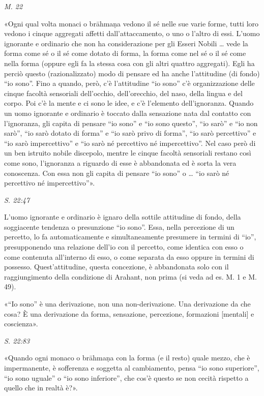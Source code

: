 \emph{M. 22}


«Ogni qual volta monaci o brāhmaṇa vedono il sé nelle sue varie forme,
tutti loro vedono i cinque aggregati affetti dall’attaccamento, o uno o
l’altro di essi. L’uomo ignorante e ordinario che non ha considerazione
per gli Esseri Nobili … vede la forma come sé o il sé come dotato di
forma, la forma come nel sé o il sé come nella forma (oppure egli fa la
stessa cosa con gli altri quattro aggregati). Egli ha perciò questo
(razionalizzato) modo di pensare ed ha anche l’attitudine (di fondo) “io
sono”. Fino a quando, però, c’è l’attitudine “io sono” c’è
organizzazione delle cinque facoltà sensoriali dell’occhio,
dell’orecchio, del naso, della lingua e del corpo. Poi c’è la mente e ci
sono le idee, e c’è l’elemento dell’ignoranza. Quando un uomo ignorante
e ordinario è toccato dalla sensazione nata dal contatto con
l’ignoranza, gli capita di pensare “io sono” e “io sono questo”, “io
sarò” e “io non sarò”, “io sarò dotato di forma” e “io sarò privo di
forma”, “io sarò percettivo” e “io sarò impercettivo” e “io sarò né
percettivo né impercettivo”. Nel caso però di un ben istruito nobile
discepolo, mentre le cinque facoltà sensoriali restano così come sono,
l’ignoranza a riguardo di esse è abbandonata ed è sorta la vera
conoscenza. Con essa non gli capita di pensare “io sono” o … “io sarò né
percettivo né impercettivo”».


\emph{S. 22:47}


 L’uomo ignorante e ordinario è ignaro della sottile
attitudine di fondo, della soggiacente tendenza o presunzione “io sono”.
Essa, nella percezione di un percetto, lo fa automaticamente e
simultaneamente presumere in termini di “io”, presupponendo una
relazione dell’io con il percetto, come identica con esso o come
contenuta all’interno di esso, o come separata da esso oppure in termini
di possesso. Quest’attitudine, questa concezione, è abbandonata solo con
il raggiungimento della condizione di Arahant, non prima (si veda ad es.
M. 1 e M. 49).


 «“Io sono” è una derivazione, non una non-derivazione. Una
derivazione da che cosa? È una derivazione da forma, sensazione,
percezione, formazioni [mentali] e coscienza».


\emph{S. 22:83}


«Quando ogni monaco o brāhmaṇa con la forma (e il resto) quale mezzo,
che è impermanente, è sofferenza e soggetta al cambiamento, pensa “io
sono superiore”, “io sono uguale” o “io sono inferiore”, che cos’è
questo se non cecità rispetto a quello che in realtà è?».


